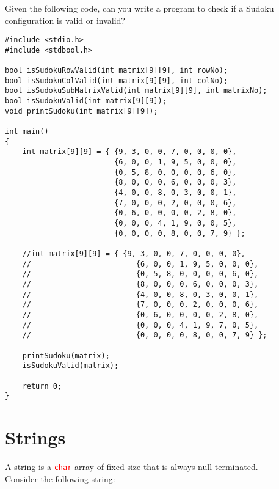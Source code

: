 \documentclass[12pt]{article}
\begin{document}
\newpage
\noindent Given the following code, can you write a program to check if a Sudoku configuration is valid or invalid?

\begin{verbatim}
#include <stdio.h>
#include <stdbool.h>

bool isSudokuRowValid(int matrix[9][9], int rowNo);
bool isSudokuColValid(int matrix[9][9], int colNo);
bool isSudokuSubMatrixValid(int matrix[9][9], int matrixNo);
bool isSudokuValid(int matrix[9][9]);
void printSudoku(int matrix[9][9]);

int main()
{
    int matrix[9][9] = { {9, 3, 0, 0, 7, 0, 0, 0, 0},
                         {6, 0, 0, 1, 9, 5, 0, 0, 0},
                         {0, 5, 8, 0, 0, 0, 0, 6, 0},
                         {8, 0, 0, 0, 6, 0, 0, 0, 3},
                         {4, 0, 0, 8, 0, 3, 0, 0, 1},
                         {7, 0, 0, 0, 2, 0, 0, 0, 6},
                         {0, 6, 0, 0, 0, 0, 2, 8, 0},
                         {0, 0, 0, 4, 1, 9, 0, 0, 5},
                         {0, 0, 0, 0, 8, 0, 0, 7, 9} };

    //int matrix[9][9] = { {9, 3, 0, 0, 7, 0, 0, 0, 0},
    //                        {6, 0, 0, 1, 9, 5, 0, 0, 0},
    //                        {0, 5, 8, 0, 0, 0, 0, 6, 0},
    //                        {8, 0, 0, 0, 6, 0, 0, 0, 3},
    //                        {4, 0, 0, 8, 0, 3, 0, 0, 1},
    //                        {7, 0, 0, 0, 2, 0, 0, 0, 6},
    //                        {0, 6, 0, 0, 0, 0, 2, 8, 0},
    //                        {0, 0, 0, 4, 1, 9, 7, 0, 5},
    //                        {0, 0, 0, 0, 8, 0, 0, 7, 9} };

    printSudoku(matrix);
    isSudokuValid(matrix);

    return 0;
}
\end{verbatim}










\newpage
{}
\part*{\centering Strings}

\noindent A string is a \textcolor{red}{\texttt{char}} array of fixed size that is always null terminated. \\  

\noindent Consider the following string: 
\end{document}
